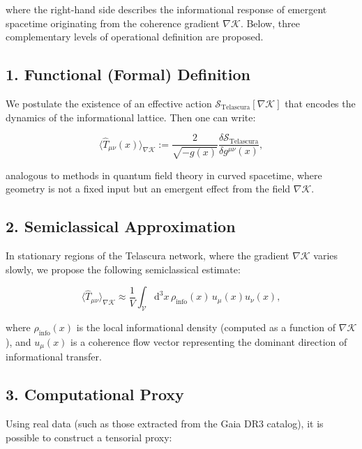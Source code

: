 \documentclass[12pt]{article}
\begin{document}
where the right-hand side describes the informational response of emergent spacetime originating from the coherence gradient $\nabla \mathcal{K}$. Below, three complementary levels of operational definition are proposed.

\subsection*{1. Functional (Formal) Definition}

We postulate the existence of an effective action $\mathcal{S}_{\text{Telascura}}[\nabla \mathcal{K}]$ that encodes the dynamics of the informational lattice. Then one can write:

\begin{equation}
\langle \hat{T}_{\mu\nu}(x) \rangle_{\nabla \mathcal{K}} := \frac{2}{\sqrt{-g(x)}} \frac{\delta \mathcal{S}_{\text{Telascura}}}{\delta g^{\mu\nu}(x)},
\end{equation}

analogous to methods in quantum field theory in curved spacetime, where geometry is not a fixed input but an emergent effect from the field $\nabla \mathcal{K}$.

\subsection*{2. Semiclassical Approximation}

In stationary regions of the Telascura network, where the gradient $\nabla \mathcal{K}$ varies slowly, we propose the following semiclassical estimate:

\begin{equation}
\langle \hat{T}_{\mu\nu} \rangle_{\nabla \mathcal{K}} \approx \frac{1}{V} \int_{\mathcal{V}} \mathrm{d}^3x \, \rho_{\text{info}}(x) \, u_\mu(x) u_\nu(x),
\end{equation}

where $\rho_{\text{info}}(x)$ is the local informational density (computed as a function of $\nabla \mathcal{K}$), and $u_\mu(x)$ is a coherence flow vector representing the dominant direction of informational transfer.

\subsection*{3. Computational Proxy}

Using real data (such as those extracted from the Gaia DR3 catalog), it is possible to construct a tensorial proxy:
\end{document}
